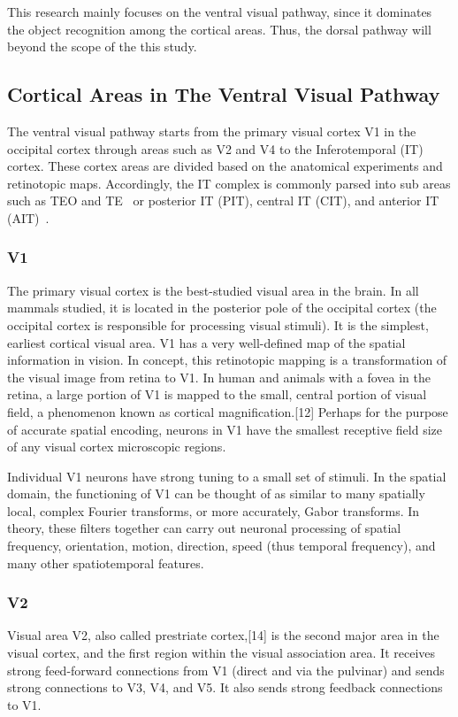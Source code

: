 This research mainly focuses on the ventral visual pathway, since it dominates the object recognition among the cortical areas.
Thus, the dorsal pathway will beyond the scope of the this study. 


\subsection{Cortical Areas in The Ventral Visual Pathway}
The ventral visual pathway starts from the primary visual cortex V1 in the occipital cortex through areas such as V2 and V4 to the Inferotemporal (IT) cortex.
These cortex areas are divided based on the anatomical experiments and retinotopic maps.
Accordingly, the IT complex is commonly parsed into sub areas such as TEO and TE~\cite{janssen2000selectivity,von1947neocortex} or posterior IT (PIT), central IT (CIT), and anterior IT (AIT)~\cite{felleman1991distributed}.
\subsubsection{V1}
The primary visual cortex is the best-studied visual area in the brain.
In all mammals studied, it is located in the posterior pole of the occipital cortex (the occipital cortex is responsible for processing visual stimuli).
It is the simplest, earliest cortical visual area.
V1 has a very well-defined map of the spatial information in vision.
In concept, this retinotopic mapping is a transformation of the visual image from retina to V1.
In human and animals with a fovea in the retina, a large portion of V1 is mapped to the small, central portion of visual field, a phenomenon known as cortical magnification.[12]
Perhaps for the purpose of accurate spatial encoding, neurons in V1 have the smallest receptive field size of any visual cortex microscopic regions.

Individual V1 neurons have strong tuning to a small set of stimuli.
In the spatial domain, the functioning of V1 can be thought of as similar to many spatially local, complex Fourier transforms, or more accurately, Gabor transforms.
In theory, these filters together can carry out neuronal processing of spatial frequency, orientation, motion, direction, speed (thus temporal frequency), and many other spatiotemporal features. 

\subsubsection{V2}
Visual area V2, also called prestriate cortex,[14] is the second major area in the visual cortex, and the first region within the visual association area. 
It receives strong feed-forward connections from V1 (direct and via the pulvinar) and sends strong connections to V3, V4, and V5. It also sends strong feedback connections to V1.


